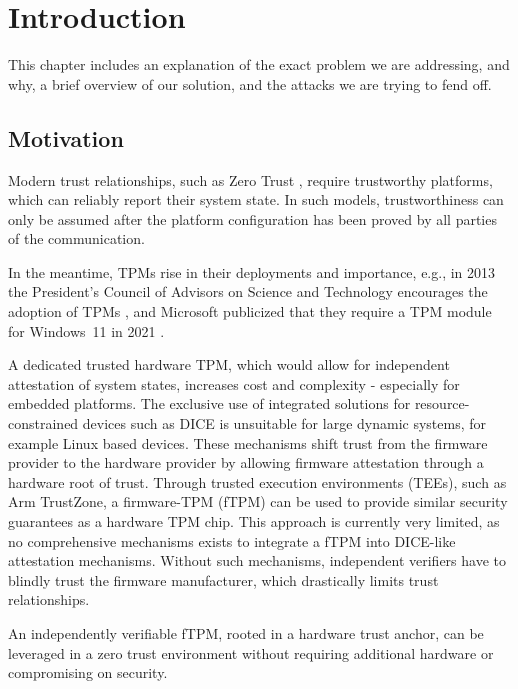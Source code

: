
\chapter{Introduction}\label{chapter:introduction}

This chapter includes an explanation of the exact problem we are addressing, and why, a brief overview of our solution, and the attacks we are trying to fend off.

\section{Motivation}

Modern trust relationships, such as Zero Trust \cite{isaca2021}, require trustworthy platforms, which can reliably report their system state.
In such models, trustworthiness can only be assumed after the platform configuration has been proved by all parties of the communication.

In the meantime, TPMs rise in their deployments and importance, e.g., in 2013 the President's Council of Advisors on Science and Technology encourages the adoption of TPMs \cite{usa}, and Microsoft publicized that they require a TPM module for Windows~11 in 2021 \cite{win11req}.

A dedicated trusted hardware TPM, which would allow for independent attestation of system states, increases cost and complexity - especially for embedded platforms.
The exclusive use of integrated solutions for resource-constrained devices such as \ac{DICE} is unsuitable for large dynamic systems, for example Linux based devices.
These mechanisms shift trust from the firmware provider to the hardware provider by allowing firmware attestation through a hardware root of trust.
Through trusted execution environments (TEEs), such as Arm TrustZone, a firmware-TPM (fTPM) can be used to provide similar security guarantees as a hardware TPM chip.
This approach is currently very limited, as no comprehensive mechanisms exists to integrate a fTPM into DICE-like attestation mechanisms.
Without such mechanisms, independent verifiers have to blindly trust the firmware manufacturer, which drastically limits trust relationships.

An independently verifiable fTPM, rooted in a hardware trust anchor, can be leveraged in a zero trust environment without requiring additional hardware or compromising on security.

